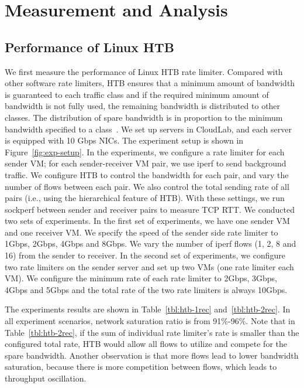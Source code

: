 \section{Measurement and Analysis}
\label{rate-limiter:sec:measurement} 


\subsection{Performance of Linux HTB}


We first measure the performance of Linux HTB rate limiter. 
Compared with other software rate limiters, HTB ensures that a minimum amount of bandwidth is guaranteed 
to each traffic class and
if the required minimum amount of bandwidth is not fully used, the remaining bandwidth is distributed to other classes.
The distribution of spare bandwidth is in proportion to the minimum bandwidth specified to a class~\cite{linux-htb-intro}.
We set up servers in CloudLab, and each server is equipped with 10 Gbps NICs. 
The experiment setup is shown in Figure~\ref{fig:exp-setup}.
In the experiments, we configure a rate limiter for each sender VM; 
for each sender-receiver VM pair, we use iperf to send background traffic. 
We configure HTB to control the bandwidth for each pair, and vary the number of flows between each pair.
We also control the total sending rate of all pairs (i.e., using the hierarchical feature of HTB).
With these settings, we run sockperf between sender and receiver pairs to measure TCP RTT. 
We conducted two sets of experiments. In the first set of experiments, 
we have one sender VM and one receiver VM.
We specify the speed of the sender side rate limiter to 1Gbps, 2Gbps, 4Gbps and 8Gbps. 
We vary the number of iperf flows (1, 2, 8 and 16) from
the sender to receiver. In the second set of experiments, 
we configure two rate limiters on the sender server and set up two VMs (one rate limiter each VM).
We configure the minimum rate of each rate limiter to 2Gbps, 3Gbps, 4Gbps and 5Gbps and
the total rate of the two rate limiters is always 10Gbps. 




The experiments results are shown in Table~\ref{tbl:htb-1rec} and~\ref{tbl:htb-2rec}. 
In all experiment scenarios, network saturation ratio is from 91\%-96\%. 
Note that in Table~\ref{tbl:htb-2rec}, if the sum of individual rate limiter's rate is smaller than the configured total rate, 
HTB would allow all flows to utilize and compete for the spare bandwidth. 
Another observation is that more flows lead to lower bandwidth saturation, 
because there is more competition between flows, which leads to throughput oscillation.

